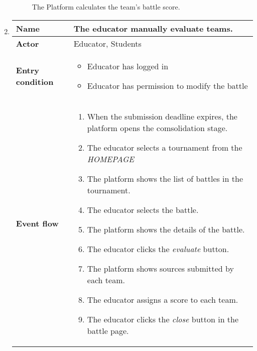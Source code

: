 \begin{enumerate}[label=\textbf{UC\arabic*}:,leftmargin=1.3cm]
          \begin{figure}[H]
              \centering
              \caption{The Platform calculates the team's battle score.}
              \label{fig:Subscribe to tournament from notification}
          \end{figure}
          \pagebreak
    \item \textbf{}
          \begin{table}[H]
              \centering
              \begin{tabular}{|l|p{11.9cm}|}
                  \hline
                  \textbf{Name}            & The educator manually evaluate teams.                                       \\\hline
                  \textbf{Actor}           & Educator, Students                                                          \\\hline
                  \textbf{Entry condition} &
                  \begin{itemize}
                      \item Educator has logged in
                      \item Educator has permission to modify the battle
                  \end{itemize}                                                      \\\hline
                  \textbf{Event flow}      &
                  \begin{enumerate}[label=\arabic*.]
                      \item When the submission deadline expires, the platform opens the comsolidation stage.
                      \item The educator selects a tournament from the \emph{HOMEPAGE}
                      \item The platform shows the list of battles in the tournament.
                      \item The educator selects the battle.
                      \item The platform shows the details of the battle.
                      \item The educator clicks the \emph{evaluate} button.
                      \item The platform shows sources submitted by each team.
                      \item The educator assigns a score to each team.
                      \item The educator clicks the \emph{close} button in the battle page.

\end{enumerate}
\end{tabular}
\end{table}
\end{enumerate}
